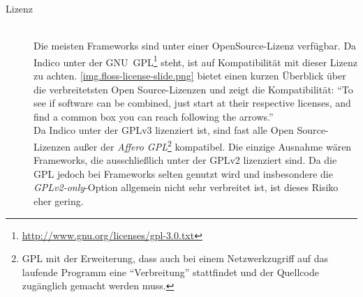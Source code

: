 \begin{description}
\item[Lizenz] \hfill \\
Die meisten Frameworks sind unter einer OpenSource-Lizenz verfügbar.
Da Indico unter der
GNU~GPL\footnote{\href{http://www.gnu.org/licenses/gpl-3.0.txt}{http://www.gnu.org/licenses/gpl-3.0.txt}}
steht, ist auf Kompatibilität mit dieser Lizenz zu achten. \autoref{img.floss-license-slide.png}
bietet einen kurzen Überblick über die verbreitetsten Open Source-Lizenzen und zeigt die
Kompatibilität: \enquote{To see if software can be combined, just start at their respective
licenses, and find a common box you can reach following the arrows.} \citep{osslic} \\
Da Indico unter der GPLv3 lizenziert ist, sind fast alle Open Source-Lizenzen außer der \emph{Affero
GPL}\footnote{GPL mit der Erweiterung, dass auch bei einem Netzwerkzugriff auf das laufende Programm
eine \enquote{Verbreitung} stattfindet und der Quellcode zugänglich gemacht werden muss.}
kompatibel. Die einzige Ausnahme wären Frameworks, die ausschließlich unter der GPLv2 lizenziert
sind. Da die GPL jedoch bei Frameworks selten genutzt wird und insbesondere die
\emph{GPLv2-only}-Option allgemein nicht sehr verbreitet ist, ist dieses Risiko eher gering.
\end{description}

